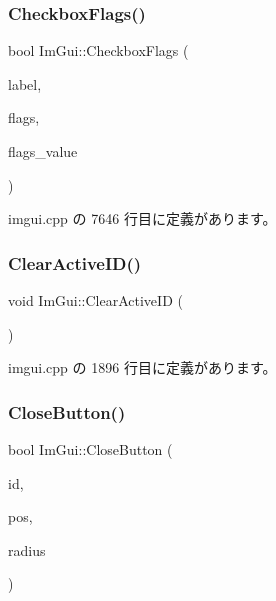 \mbox{\label{namespace_im_gui_aeca400dcf5a82c312b3e669d2fe6e88d}} 
\subsubsection{\texorpdfstring{Checkbox\+Flags()}{CheckboxFlags()}}
{\footnotesize\ttfamily bool Im\+Gui\+::\+Checkbox\+Flags (\begin{DoxyParamCaption}\item[{const char $\ast$}]{label,  }\item[{unsigned int $\ast$}]{flags,  }\item[{unsigned int}]{flags\+\_\+value }\end{DoxyParamCaption})}



 imgui.\+cpp の 7646 行目に定義があります。

\mbox{\label{namespace_im_gui_a17ff60ad1e2669130ac38a04d16eb354}} 
\subsubsection{\texorpdfstring{Clear\+Active\+I\+D()}{ClearActiveID()}}
{\footnotesize\ttfamily void Im\+Gui\+::\+Clear\+Active\+ID (\begin{DoxyParamCaption}{ }\end{DoxyParamCaption})}



 imgui.\+cpp の 1896 行目に定義があります。

\mbox{\label{namespace_im_gui_a5e8e4df6418dcda3c4c5d15ecdf7d968}} 
\subsubsection{\texorpdfstring{Close\+Button()}{CloseButton()}}
{\footnotesize\ttfamily bool Im\+Gui\+::\+Close\+Button (\begin{DoxyParamCaption}\item[{\mbox{\hyperlink{imgui_8h_a1785c9b6f4e16406764a85f32582236f}{Im\+Gui\+ID}}}]{id,  }\item[{const \mbox{\hyperlink{struct_im_vec2}{Im\+Vec2}} \&}]{pos,  }\item[{float}]{radius }\end{DoxyParamCaption})}




